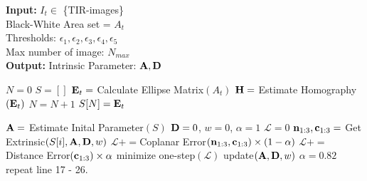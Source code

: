 \begin{algorithm}[!b]
	\scriptsize
	\algrenewcommand{}
	\caption{Calibration with non-bias estimator}
	\label{alg:keypoint}
	\hspace*{\algorithmicindent} \textbf{Input:} $I_t \in$ \{TIR-images\} \\
	\hspace*{\algorithmicindent} Black-White Area set = $A_t$\\
	\hspace*{\algorithmicindent} Thresholds: $\epsilon_1,\epsilon_2,\epsilon_3,\epsilon_4,\epsilon_5$\\
	\hspace*{\algorithmicindent} Max number of image: $N_{max}$\\
	\hspace*{\algorithmicindent} \textbf{Output:} Intrinsic Parameter: $\bold A, \bold D$
	\begin{algorithmic}[1]
		\State $N=0$
		\State $S = []$
		        \State $\bold E_t=$ Calculate Ellipse Matrix$(A_t)$
		            \State $\bold H =$ Estimate Homography$(\bold E_t)$
		                \State $N = N+1$
                            \State $S[N]= \bold E_t$
		            \EndIf
		        \EndIf
		    \EndIf
		\EndWhile
		
		\State $\bold A= $ Estimate Inital Parameter$(S)$
		\State $\bold D= 0$, $w= 0$, $\alpha=1$
		    \State $\mathcal{L}=0$
		        \State $\bold n_{1:3}, \bold c_{1:3}=$ Get Extrinsic$(S[i],\bold A,\bold D, w)$
		        \State $\mathcal{L}+=$Coplanar Error$(\bold n_{1:3}, \bold c_{1:3})\times (1-\alpha)$ 
		        \State $\mathcal{L}+=$Distance Error$(\bold c_{1:3})\times \alpha$
		    \EndFor
	        \State minimize one-step$(\mathcal{L})$
	        \State update$(\bold A, \bold D, w)$
	    \EndWhile
        \State $\alpha =  0.82$
        \State repeat line 17 - 26. 
        \end{algorithmic}
\end{algorithm}
